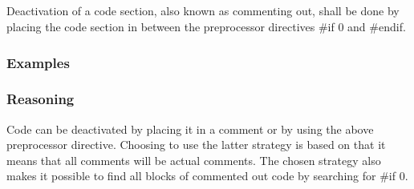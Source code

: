 \subsection*{\codingRule{}}

Deactivation of a code section, also known as commenting out, shall be done by placing the code section in between the preprocessor directives \#if 0 and \#endif.

\subsubsection*{Examples}

\noindent
\begin{minipage}[t]{\codelstwidth\linewidth}
    
\end{minipage}
\hfill
\begin{minipage}[t]{\codelstwidth\linewidth}
    
\end{minipage}

\subsubsection*{Reasoning}

Code can be deactivated by placing it in a comment or by using the above preprocessor directive. Choosing to use the latter strategy is based on that it means that all comments will be actual comments. The chosen strategy also makes it possible to find all blocks of commented out code by searching for \#if 0.